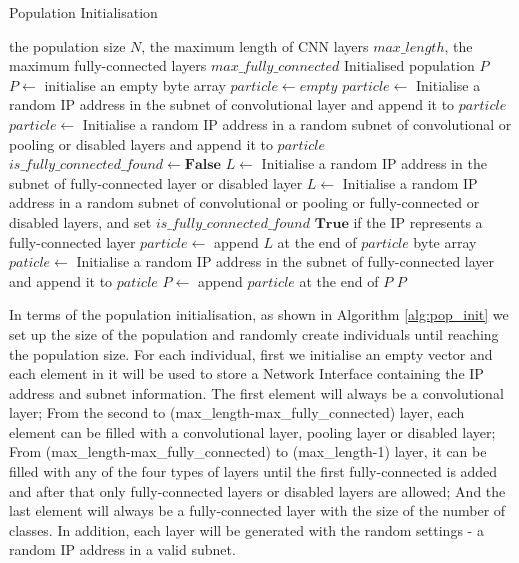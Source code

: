 \documentclass[conference]{IEEEtran}
\begin{document}
\begin{algorithm}
	\caption{Population Initialisation}
	\label{alg:pop_init}
	\begin{algorithmic}
		\renewcommand{\algorithmicrequire}{\textbf{Input:}}
		\renewcommand{\algorithmicensure}{\textbf{Output:}}
		\REQUIRE the population size $N$, the maximum length of CNN layers $max\_length$, the maximum fully-connected layers $max\_fully\_connected$
		\ENSURE Initialised population $P$
		\STATE $P \leftarrow$ initialise an empty byte array
			\STATE $particle \leftarrow empty$
			\STATE $particle \leftarrow$ Initialise a random IP address in the subnet of convolutional layer and append it to $particle$
				\STATE $particle \leftarrow$ Initialise a random IP address in a random subnet of convolutional or pooling or disabled layers and append it to $particle$
			\ENDWHILE
			\STATE $is\_fully\_connected\_found \leftarrow \textbf{False}$
					\STATE $L \leftarrow$ Initialise a random IP address in the subnet of fully-connected layer or disabled layer
				\ELSE
					\STATE $L \leftarrow$ Initialise a random IP address in a random subnet of convolutional or pooling or fully-connected or disabled layers, and set $is\_fully\_connected\_found$ $\textbf{True}$ if the IP represents a fully-connected layer
				\ENDIF
				\STATE $particle \leftarrow$ append $L$ at the end of $particle$ byte array
			\ENDWHILE
			\STATE $paticle \leftarrow$ Initialise a random IP address in the subnet of fully-connected layer and append it to $paticle$
			\STATE $P \leftarrow$ append $particle$ at the end of $P$
		\ENDWHILE
		\RETURN $P$
	\end{algorithmic}
\end{algorithm}

In terms of the population initialisation, as shown in Algorithm \ref{alg:pop_init} we set up the size of the population and randomly create individuals until reaching the population size. 
For each individual, first we initialise an empty vector and each element in it will be used to store a Network Interface containing the IP address and subnet information. The first element will always be a convolutional layer; From the second to (max\_length-max\_fully\_connected) layer, each element can be filled with a convolutional layer, pooling layer or disabled layer; From (max\_length-max\_fully\_connected) to (max\_length-1) layer, it can be filled with any of the four types of layers until the first fully-connected is added and after that only fully-connected layers or disabled layers are allowed; And the last element will always be a fully-connected layer with the size of the number of classes. In addition, each layer will be generated with the random settings - a random IP address in a valid subnet.
\end{document}
